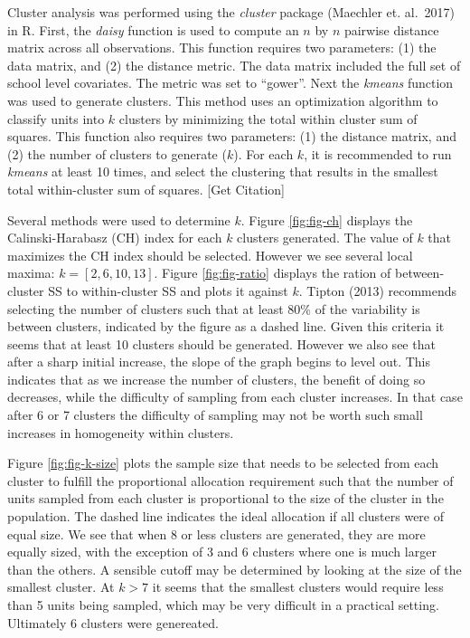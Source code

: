 \documentclass[man,floatsintext]{apa6}
\begin{document}
Cluster analysis was performed using the \emph{cluster} package (Maechler et. al.~2017) in R. First, the \emph{daisy} function is used to compute an \(n\) by \(n\) pairwise distance matrix across all observations. This function requires two parameters: (1) the data matrix, and (2) the distance metric. The data matrix included the full set of school level covariates. The metric was set to \enquote{gower}. Next the \emph{kmeans} function was used to generate clusters. This method uses an optimization algorithm to classify units into \(k\) clusters by minimizing the total within cluster sum of squares. This function also requires two parameters: (1) the distance matrix, and (2) the number of clusters to generate (\(k\)). For each \(k\), it is recommended to run \emph{kmeans} at least 10 times, and select the clustering that results in the smallest total within-cluster sum of squares. {[}Get Citation{]}

Several methods were used to determine \(k\). Figure \ref{fig:fig-ch} displays the Calinski-Harabasz (CH) index for each \(k\) clusters generated. The value of \(k\) that maximizes the CH index should be selected. However we see several local maxima: \(k = [2, 6, 10, 13]\). Figure \ref{fig:fig-ratio} displays the ration of between-cluster SS to within-cluster SS and plots it against \(k\). Tipton (2013) recommends selecting the number of clusters such that at least 80\% of the variability is between clusters, indicated by the figure as a dashed line. Given this criteria it seems that at least 10 clusters should be generated. However we also see that after a sharp initial increase, the slope of the graph begins to level out. This indicates that as we increase the number of clusters, the benefit of doing so decreases, while the difficulty of sampling from each cluster increases. In that case after 6 or 7 clusters the difficulty of sampling may not be worth such small increases in homogeneity within clusters.

Figure \ref{fig:fig-k-size} plots the sample size that needs to be selected from each cluster to fulfill the proportional allocation requirement such that the number of units sampled from each cluster is proportional to the size of the cluster in the population. The dashed line indicates the ideal allocation if all clusters were of equal size. We see that when 8 or less clusters are generated, they are more equally sized, with the exception of 3 and 6 clusters where one is much larger than the others. A sensible cutoff may be determined by looking at the size of the smallest cluster. At \(k > 7\) it seems that the smallest clusters would require less than 5 units being sampled, which may be very difficult in a practical setting. Ultimately 6 clusters were genereated.
\end{document}
